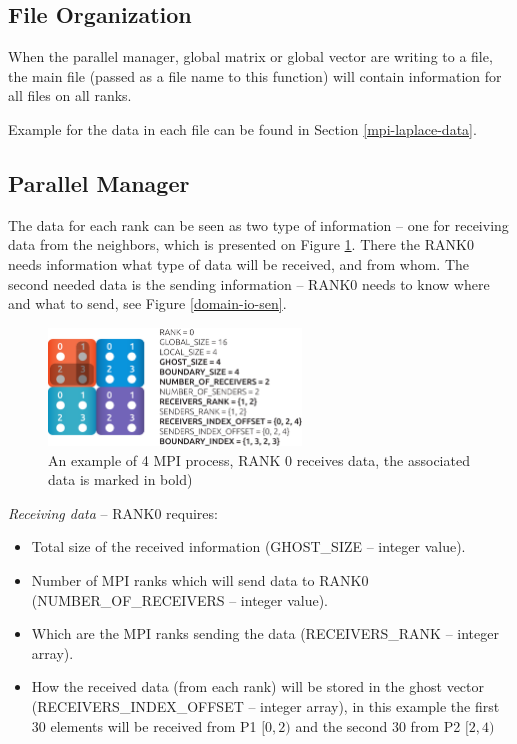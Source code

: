 \subsection{File Organization}

When the parallel manager, global matrix or global vector are writing to a file, the main file (passed as a file name to this function) will contain information for all files on all ranks.







Example for the data in each file can be found in Section \ref{mpi-laplace-data}.

\subsection{Parallel Manager}

The data for each rank can be seen as two type of information -- one for receiving data from the neighbors, which is presented on Figure \ref{domain-io-rec}. There the RANK0 needs information what type of data will be received, and from whom. The second needed data is the sending information -- RANK0 needs to know where and what to send, see Figure \ref{domain-io-sen}.

\begin{figure}[!ht]
\centering
\includegraphics[width=0.6\textwidth]{./fig/mpi-4x4-domain4.pdf}
\caption{An example of 4 MPI process, RANK 0 receives data, the associated data is marked in bold)}
\label{domain-io-rec}
\end{figure}

\emph{Receiving data} -- RANK0 requires:
\begin{itemize}
  \item Total size of the received information (GHOST\_SIZE -- integer value). 
  \item Number of MPI ranks which will send data to RANK0 (NUMBER\_OF\_RECEIVERS -- integer value).
  \item Which are the MPI ranks sending the data (RECEIVERS\_RANK -- integer array).
  \item How the received data (from each rank) will be stored in the ghost vector (RECEIVERS\_INDEX\_OFFSET -- integer array), in this example the first 30 elements will be received from P1 $[0,2)$ and the second 30 from P2 $[2,4)$
\end{itemize}


